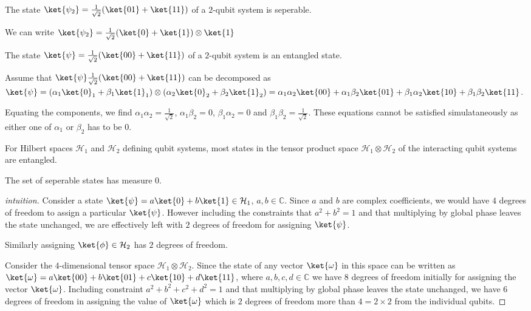 \begin{eg}
The state $\ket{\psi_2} = \frac{1}{\sqrt{2}} (\ket{01} + \ket{11})$ of a $2$-qubit system is seperable. 

We can write $\ket{\psi_2} = \frac{1}{\sqrt{2}} (\ket{0} + \ket{1}) \otimes \ket{1}$
\end{eg}


\begin{eg}
The state $\ket{\psi} = \frac{1}{\sqrt{2}} (\ket{00} + \ket{11})$ of a $2$-qubit system is an entangled state.

    Assume that  $\ket{\psi} \frac{1}{\sqrt{2}} (\ket{00} + \ket{11}) $ can be decomposed as $\ket{\psi} = (\alpha_1 \ket{0}_1 + \beta_1 \ket{1}_1) \otimes (\alpha_2 \ket{0}_2 + \beta_2 \ket{1}_2) = \alpha_1 \alpha_2 \ket{00} + \alpha_1 \beta_2 \ket{01} + \beta_1 \alpha_2 \ket{10} + \beta_1 \beta_2 \ket{11}$.

    Equating the components, we find $\alpha_1 \alpha_2 = \displaystyle\frac{1}{\sqrt{2}}$, $\alpha_1 \beta_2 = 0$, $\beta_1 \alpha_2 = 0$ and $\beta_1 \beta_2 = \displaystyle\frac{1}{\sqrt{2}}$. These equations cannot be satisfied simulataneously as either one of $\alpha_1$ or $\beta_2$ has to be $0$.
\end{eg}


For Hilbert spaces $\mathcal{H}_1$ and $\mathcal{H}_2$ defining qubit systems, most states in the tensor product space $\mathcal{H}_1 \otimes \mathcal{H}_2$ of the interacting qubit systems are entangled.
\begin{prop}
    The set of seperable states has measure 0.
\end{prop}
\begin{proof}[intuition]
    Consider a state $\ket{\psi} = a \ket{0} + b \ket{1} \in \mathcal{H}_1$, $a,b \in \mathbb{C}$. Since $a$ and $b$ are complex coefficients, we would have $4$ degrees of freedom to assign a particular $\ket{\psi}$. However including the constraints that $a^2 + b^2 = 1$ and that multiplying by global phase leaves the state unchanged, we are effectively left with $2$ degrees of freedom for assigning $\ket{\psi}$. 
    
Similarly assigning $\ket{\phi} \in \mathcal{H}_2$ has $2$ degrees of freedom.

    Consider the $4$-dimensional tensor space $\mathcal{H}_1 \otimes \mathcal{H}_2$. Since the state of any vector $\ket{\omega}$ in this space can be written as $\ket{\omega} = a \ket{00} + b \ket{01} + c \ket{10} + d \ket{11}$, where $a, b, c, d \in \mathbb{C}$ we have $8$ degrees of freedom initially for assigning the vector $\ket{\omega}$. Including constraint $a^2 + b^2 + c^2 + d^2 = 1$ and that multiplying by global phase leaves the state unchanged, we have $6$ degrees of freedom in assigning the value of $\ket{\omega}$ which is $2$ degrees of freedom more than $4 = 2 \times 2$ from the individual qubits.
\end{proof}
